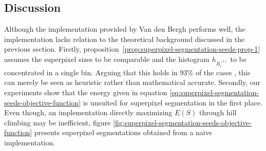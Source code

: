 \subsection{Discussion}

Although the implementation provided by Van den Bergh \etal performs well, the implementation lacks relation to the theoretical background discussed in the previous section. Firstly, proposition~\ref{prop:superpixel-segmentation-seeds-prop-1} assumes the superpixel sizes to be comparable and the histogram $h_{B_i^{(l)}}$ to be concentrated in a single bin. Arguing that this holds in 93\% of the cases \cite{VanDenBerghBoixRoigCapitaniVanGool:2012}, this can merely be seen as heuristic rather than mathematical accurate. Secondly, our experiments show that the energy given in equation \eqref{eq:superpixel-segmentation-seeds-objective-function} is unsuited for superpixel segmentation in the first place. Even though, an implementation directly maximizing $E(S)$ through hill climbing may be inefficient, figure \ref{fig:superpixel-segmentation-seeds-objective-function} presents superpixel segmentations obtained from a naive implementation.
